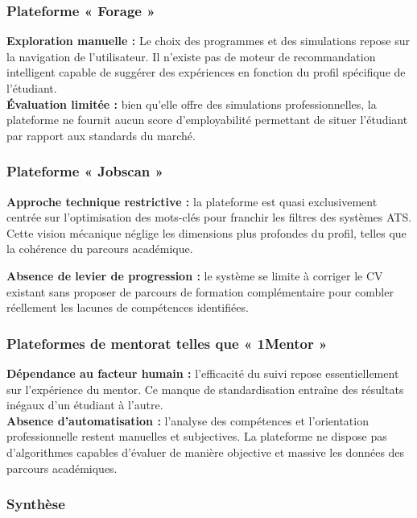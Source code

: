 \subsubsection{Plateforme « Forage »}

\textbf{Exploration manuelle :} Le choix des programmes et des simulations repose sur la navigation de l’utilisateur. Il n’existe pas de moteur de recommandation intelligent capable de suggérer des expériences en fonction du profil spécifique de l’étudiant.\\
\textbf{Évaluation limitée :} bien qu’elle offre des simulations professionnelles, la plateforme ne fournit aucun score d’employabilité permettant de situer l’étudiant par rapport aux standards du marché.

\subsubsection{Plateforme « Jobscan »}

\textbf{Approche technique restrictive :} la plateforme est quasi exclusivement centrée sur l’optimisation des mots-clés pour franchir les filtres des systèmes ATS. Cette vision mécanique néglige les dimensions plus profondes du profil, telles que la cohérence du parcours académique.

\noindent \textbf{Absence de levier de progression :} le système se limite à corriger le CV existant sans proposer de parcours de formation complémentaire pour combler réellement les lacunes de compétences identifiées.

\subsubsection{Plateformes de mentorat telles que « 1Mentor »}

\textbf{Dépendance au facteur humain :} l’efficacité du suivi repose essentiellement sur l’expérience du mentor. Ce manque de standardisation entraîne des résultats inégaux d’un étudiant à l’autre.\\
\textbf{Absence d’automatisation :} l’analyse des compétences et l’orientation professionnelle restent manuelles et subjectives. La plateforme ne dispose pas d’algorithmes capables d’évaluer de manière objective et massive les données des parcours académiques.

\subsubsection{Synthèse}

